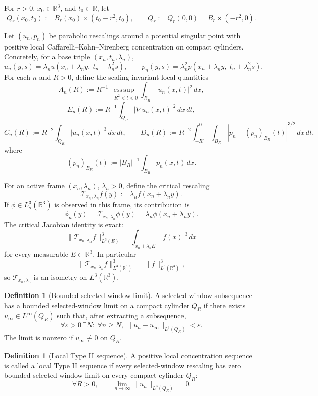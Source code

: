 \documentclass[11pt]{amsart}
\theoremstyle{plain}
\theoremstyle{definition}
\newtheorem{definition}[theorem]{Definition}
\theoremstyle{remark}
\begin{document}
For $r>0$, $x_0\in\mathbb R^3$, and $t_0\in\mathbb R$, let
\[
  Q_r(x_0,t_0):=B_r(x_0)\times(t_0-r^2,t_0),
  \qquad
  Q_r:=Q_r(0,0)=B_r\times(-r^2,0).
\]

Let $(u_n,p_n)$ be parabolic rescalings around a potential singular point with
positive local Caffarelli--Kohn--Nirenberg concentration on compact cylinders.
Concretely, for a base triple \((x_n,t_n,\lambda_n)\),
\[
  u_n(y,s)=\lambda_n u(x_n+\lambda_n y,\ t_n+\lambda_n^2 s),\qquad
  p_n(y,s)=\lambda_n^2 p(x_n+\lambda_n y,\ t_n+\lambda_n^2 s).
\]
For each $n$ and $R>0$, define the scaling-invariant local quantities
\[
  A_n(R):=R^{-1}\operatorname*{ess\,sup}_{-R^2<t<0}\int_{B_R}|u_n(x,t)|^2\,dx,
\]
\[
  E_n(R):=R^{-1}\int_{Q_R}|\nabla u_n(x,t)|^2\,dx\,dt,
\]
\[
  C_n(R):=R^{-2}\int_{Q_R}|u_n(x,t)|^3\,dx\,dt,
  \qquad
  D_n(R):=R^{-2}\int_{-R^2}^0\int_{B_R}|p_n-(p_n)_{B_R}(t)|^{3/2}\,dx\,dt,
\]
where
\[
  (p_n)_{B_R}(t):=|B_R|^{-1}\int_{B_R}p_n(x,t)\,dx.
\]

For an active frame \((x_n,\lambda_n)\), \(\lambda_n>0\), define the critical rescaling
\[
  \mathcal T_{x_n,\lambda_n}f(y):=\lambda_n f(x_n+\lambda_n y).
\]
If \(\phi\in L^3_\sigma(\mathbb R^3)\) is observed in this frame, its contribution is
\[
  \phi_n(y)=\mathcal T_{x_n,\lambda_n}\phi(y)=\lambda_n\phi(x_n+\lambda_n y).
\]
The critical Jacobian identity is exact:
\[
  \|\mathcal T_{x_n,\lambda_n}f\|_{L^3(E)}^3
  =\int_{x_n+\lambda_nE}|f(x)|^3\,dx
\]
for every measurable \(E\subset\mathbb R^3\).  In particular
\[
  \|\mathcal T_{x_n,\lambda_n}f\|_{L^3(\mathbb R^3)}^3
  =\|f\|_{L^3(\mathbb R^3)}^3,
\]
so \(\mathcal T_{x_n,\lambda_n}\) is an isometry on \(L^3(\mathbb R^3)\).

\begin{definition}[Bounded selected-window limit]
A selected-window subsequence has a bounded selected-window limit on a compact
cylinder $Q_R$ if there exists $u_\infty\in L^\infty(Q_R)$ such that, after
extracting a subsequence,
\[
  \forall\varepsilon>0\ \exists N:\ \forall n\ge N,\ \|u_n-u_\infty\|_{L^3(Q_R)}<\varepsilon.
\]
The limit is nonzero if $u_\infty\not\equiv0$ on $Q_R$.
\end{definition}

\begin{definition}[Local Type II sequence]
A positive local concentration sequence is called a local Type II sequence if every
selected-window rescaling has zero bounded selected-window limit on every compact
cylinder \(Q_R\):
\[
  \forall R>0,\qquad \lim_{n\to\infty}\|u_n\|_{L^3(Q_R)}=0.
\]
\end{definition}
\end{document}
